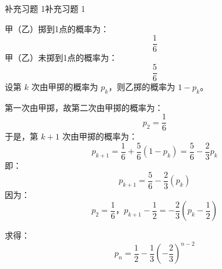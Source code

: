 \documentclass[twoside]{article}
\begin{document}
\begin{ans}{补充习题 1}{补充习题 1}
    
    甲（乙）掷到1点的概率为：
    \[
    \frac{1}{6}
    \]
    甲（乙）未掷到1点的概率为：
    \[
    \frac{5}{6}
    \]
    设第 \(k\) 次由甲掷的概率为 \(p_k\)，则乙掷的概率为 \(1 - p_k\)。
    
    第一次由甲掷，故第二次由甲掷的概率为：
    \[
    p_2 = \frac{1}{6}
    \]
    于是，第 \(k+1\) 次由甲掷的概率为：
    \[
    p_{k+1} = \frac{1}{6} + \frac{5}{6} (1 - p_k) = \frac{5}{6} - \frac{2}{3} p_k
    \]
    即：
    \[
    p_{k+1} = \frac{5}{6} - \frac{2}{3} \left(p_k\right)
    \]
    因为：
    \[
    p_{2} = \frac{1}{6}，p_{k+1} - \frac{1}{2} = - \frac{2}{3} \left( p_k - \frac{1}{2} \right)
    \]

    求得：
    \[
    p_n = \frac{1}{2} - \frac{1}{3} \left( -\frac{2}{3} \right)^{n-2}
    \]

\end{ans}
\end{document}
